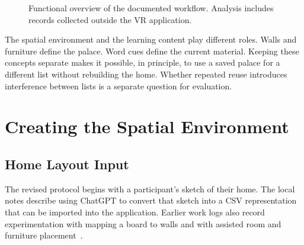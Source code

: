 \begin{figure}[htbp]
\centering
{}
\caption{Functional overview of the documented workflow. Analysis includes records collected outside the VR application.}
\label{fig:system}
\end{figure}

The spatial environment and the learning content play different roles. Walls and furniture define the palace. Word cues define the current material. Keeping these concepts separate makes it possible, in principle, to use a saved palace for a different list without rebuilding the home. Whether repeated reuse introduces interference between lists is a separate question for evaluation.

\section{Creating the Spatial Environment}
\subsection{Home Layout Input}
The revised protocol begins with a participant's sketch of their home. The local notes describe using ChatGPT to convert that sketch into a CSV representation that can be imported into the application. Earlier work logs also record experimentation with mapping a board to walls and with assisted room and furniture placement~\cite{logboard,lognov28}.

